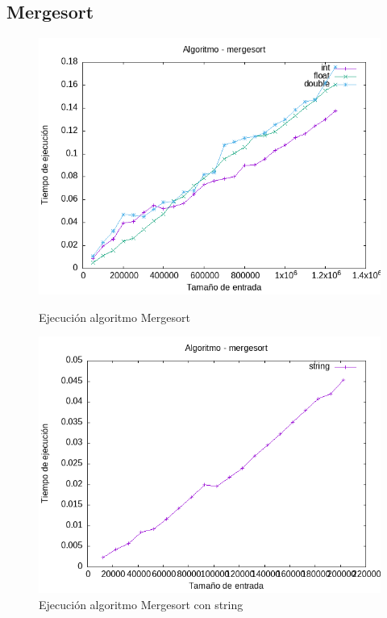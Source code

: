 \documentclass[11pt]{article}
\begin{document}
\subsection*{Mergesort}
\begin{figure}[H]
    \begin{minipage}{0.5\textwidth}
        \centering
        \includegraphics[width=\linewidth]{assets/Img/mergesort.png}
        \caption{Ejecución algoritmo Mergesort}
        \label{fig:mergesort}
    \end{minipage}%
    \begin{minipage}{0.5\textwidth}
        \centering
        \includegraphics[width=\linewidth]{assets/Img/mergesortstring.png}
        \caption{Ejecución algoritmo Mergesort con string}
        \label{fig:mergesortstring}
    \end{minipage}
\end{figure}
\end{document}
